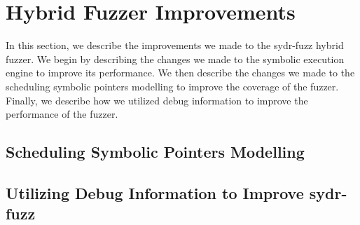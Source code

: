 \section{Hybrid Fuzzer Improvements}

In this section, we describe the improvements we made to the sydr-fuzz hybrid fuzzer. We begin by describing the changes we made to the symbolic execution engine to improve its performance. We then describe the changes we made to the scheduling symbolic pointers modelling to improve the coverage of the fuzzer. Finally, we describe how we utilized debug information to improve the performance of the fuzzer.

\subsection{Scheduling Symbolic Pointers Modelling}
\subsection{Utilizing Debug Information to Improve sydr-fuzz}